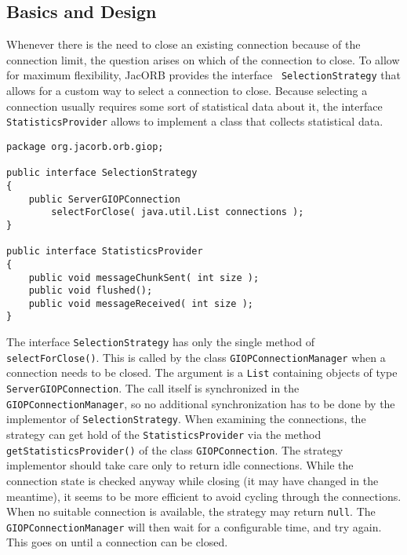 \subsection{Basics and Design}
\label{connection_management_basics}
Whenever there is the need to close an existing connection because of the
connection limit, the question arises on which of the connection to close. To
allow for maximum flexibility, JacORB provides the interface {\tt
  SelectionStrategy} that allows for a custom way to select a connection to
close. Because selecting a connection usually requires some sort of
statistical data about it, the interface {\tt
  StatisticsProvider} allows to implement a class that collects statistical
data.

\begin{small}
\begin{verbatim}
package org.jacorb.orb.giop;

public interface SelectionStrategy
{
    public ServerGIOPConnection
        selectForClose( java.util.List connections );
}

public interface StatisticsProvider
{
    public void messageChunkSent( int size );
    public void flushed();
    public void messageReceived( int size );
}
\end{verbatim}
\end{small}

The interface {\tt SelectionStrategy} has only the single method of {\tt
  selectForClose()}. This is called by the class {\tt GIOPConnectionManager}
when a connection needs to be closed. The argument is a {\tt List} containing
objects of type {\tt ServerGIOPConnection}. The call itself is synchronized in
the {\tt GIOPConnectionManager}, so no additional synchronization has to be
done by the implementor of {\tt SelectionStrategy}. When examining the
connections, the strategy can get hold of the {\tt StatisticsProvider} via the
method {\tt getStatisticsProvider()} of the class {\tt GIOPConnection}. The
strategy implementor should take care only to return idle connections. While
the connection state is checked anyway while closing (it may have changed in
the meantime), it seems to be more efficient to avoid cycling through the
connections. When no suitable connection is available, the strategy may
return {\tt null}. The {\tt GIOPConnectionManager} will then wait for a
configurable time, and try again. This goes on until a connection can be
closed.

